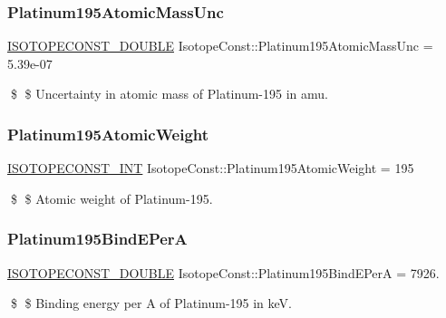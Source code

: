 \subsubsection{\texorpdfstring{Platinum195\+Atomic\+Mass\+Unc}{Platinum195AtomicMassUnc}}
{\footnotesize\ttfamily \mbox{\hyperlink{group___isotope_const-_macros_ga8f45a7272ce02c0b4c65c44636ed719a}{I\+S\+O\+T\+O\+P\+E\+C\+O\+N\+S\+T\+\_\+\+D\+O\+U\+B\+LE}} Isotope\+Const\+::\+Platinum195\+Atomic\+Mass\+Unc = 5.\+39e-\/07}

\$ \$ Uncertainty in atomic mass of Platinum-\/195 in amu. \mbox{\label{group___isotope_const-_platinum-_pt195_ga8dbcace83a588cf7d7ce8d606eadb0c7}} 
\subsubsection{\texorpdfstring{Platinum195\+Atomic\+Weight}{Platinum195AtomicWeight}}
{\footnotesize\ttfamily \mbox{\hyperlink{group___isotope_const-_macros_ga5f18360b3e99483a35c32d789e62621c}{I\+S\+O\+T\+O\+P\+E\+C\+O\+N\+S\+T\+\_\+\+I\+NT}} Isotope\+Const\+::\+Platinum195\+Atomic\+Weight = 195}

\$ \$ Atomic weight of Platinum-\/195. \mbox{\label{group___isotope_const-_platinum-_pt195_ga80c190d4d165616e5d3b9e83280b6175}} 
\subsubsection{\texorpdfstring{Platinum195\+Bind\+E\+PerA}{Platinum195BindEPerA}}
{\footnotesize\ttfamily \mbox{\hyperlink{group___isotope_const-_macros_ga8f45a7272ce02c0b4c65c44636ed719a}{I\+S\+O\+T\+O\+P\+E\+C\+O\+N\+S\+T\+\_\+\+D\+O\+U\+B\+LE}} Isotope\+Const\+::\+Platinum195\+Bind\+E\+PerA = 7926.}

\$ \$ Binding energy per A of Platinum-\/195 in keV. \mbox{\label{group___isotope_const-_platinum-_pt195_ga403309e732bf202ee4ade9b29260ec3d}} 
